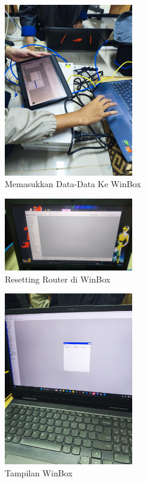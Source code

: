 \begin{figure}[H]
    \centering
    \includegraphics[width=0.5\textwidth]{P1/img/5.jpg}
    \caption{Memasukkan Data-Data Ke WinBox}
    \label{fig:labelgambar}
\end{figure}
\begin{figure}[H]
    \centering
    \includegraphics[width=0.5\textwidth]{P1/img/4.jpg}
    \caption{Resetting Router di WinBox}
    \label{fig:labelgambar}
\end{figure}
\begin{figure}[H]
    \centering
    \includegraphics[width=0.5\textwidth]{P1/img/6.jpg}
    \caption{Tampilan WinBox}
    \label{fig:labelgambar}
\end{figure}
